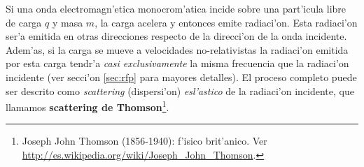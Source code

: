 
Si una onda electromagn'etica monocrom'atica incide
sobre una part'icula libre de carga $q$ y masa $m$, la carga acelera y
entonces emite radiaci'on. Esta radiaci'on ser'a emitida en otras
direcciones respecto de la direcci'on de la onda incidente. Adem'as, si la carga se mueve a velocidades no-relativistas la radiaci'on emitida por esta carga tendr'a \textit{casi exclusivamente} la misma frecuencia que la radiaci'on incidente (ver secci'on \ref{sec:rfp} para mayores detalles). El proceso completo puede ser descrito como \textit{scattering} (dispersi'on) \textit{esl'astico} de la radiaci'on incidente, que llamamos \textbf{scattering de Thomson}\footnote{Joseph John Thomson (1856-1940): f'isico brit'anico. Ver \url{http://es.wikipedia.org/wiki/Joseph_John_Thomson}.}.

